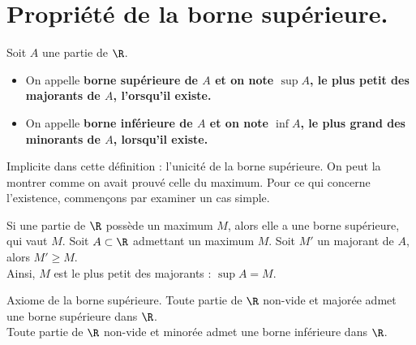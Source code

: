 \documentclass[11pt]{article}
\begin{document}


\thispagestyle{fancy}

\setcounter{section}{-1}

\section{Propriété de la borne supérieure.}

\begin{defi}{}{}
    Soit $A$ une partie de $\R$.
    \begin{itemize}
        \item On appelle \bf{borne supérieure} de $A$ et on note $\sup A$, le plus petit des majorants de $A$, l'orsqu'il existe.
        \item On appelle \bf{borne inférieure} de $A$ et on note $\inf A$, le plus grand des minorants de $A$, lorsqu'il existe.
    \end{itemize}
\end{defi}

\quad Implicite dans cette définition : l'unicité de la borne supérieure. On peut la montrer comme on avait prouvé celle du maximum. Pour ce qui concerne l'existence, commençons par examiner un cas simple.

\begin{prop}{}{}
    Si une partie de $\R$ possède un maximum $M$, alors elle a une borne supérieure, qui vaut $M$.
    \tcblower
    Soit $A\subset\R$ admettant un maximum $M$. Soit $M'$ un majorant de $A$, alors $M'\geq M$.\\
    Ainsi, $M$ est le plus petit des majorants : $\sup A = M$.
\end{prop}

\begin{thm}{Axiome de la borne supérieure.}{}
    Toute partie de $\R$ non-vide et majorée admet une borne supérieure dans $\R$.\\
    Toute partie de $\R$ non-vide et minorée admet une borne inférieure dans $\R$.
\end{thm}
\end{document}
